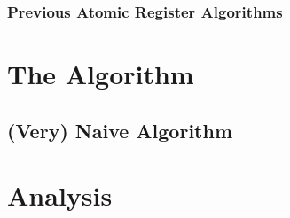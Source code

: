\documentclass{beamer}
\begin{document}
\begin{frame}
    \frametitle{Previous Atomic Register Algorithms}
\end{frame}

\section{The Algorithm}
\subsection{(Very) Naive Algorithm}

\begin{frame}
\end{frame}

\section{Analysis}
\begin{frame}
\end{frame}
\end{document}
